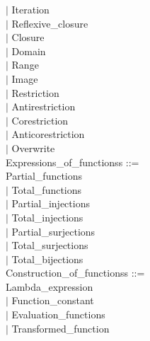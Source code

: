 \documentclass[12pt,a4paper,draft]{article}
\begin{document}
{\begin{sloppypar}
\hspace*{0.20in} $|$  Iteration\\
\hspace*{0.20in} $|$  Reflexive\_closure\\
\hspace*{0.20in} $|$  Closure\\
\hspace*{0.20in} $|$  Domain\\
\hspace*{0.20in} $|$  Range\\
\hspace*{0.20in} $|$  Image\\
\hspace*{0.20in} $|$  Restriction\\
\hspace*{0.20in} $|$  Antirestriction\\
\hspace*{0.20in} $|$  Corestriction\\
\hspace*{0.20in} $|$  Anticorestriction\\
\hspace*{0.20in} $|$  Overwrite\\
Expressions\_of\_functionss ::= \\
   Partial\_functions\\
\hspace*{0.20in} $|$  Total\_functions\\
\hspace*{0.20in} $|$  Partial\_injections\\
\hspace*{0.20in} $|$  Total\_injections\\
\hspace*{0.20in} $|$  Partial\_surjections\\
\hspace*{0.20in} $|$  Total\_surjections\\
\hspace*{0.20in} $|$  Total\_bijections\\
Construction\_of\_functionss ::= \\
   Lambda\_expression\\
\hspace*{0.20in} $|$  Function\_constant\\
\hspace*{0.20in} $|$  Evaluation\_functions\\
\hspace*{0.20in} $|$  Transformed\_function\\

\end{sloppypar}}
\end{document}
